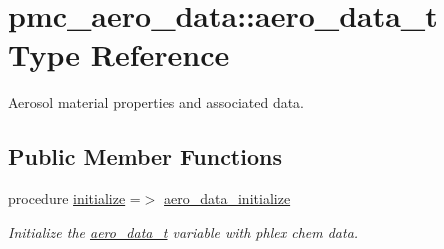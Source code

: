 \hypertarget{structpmc__aero__data_1_1aero__data__t}{}\section{pmc\+\_\+aero\+\_\+data\+:\+:aero\+\_\+data\+\_\+t Type Reference}
\label{structpmc__aero__data_1_1aero__data__t}


Aerosol material properties and associated data.  


\subsection*{Public Member Functions}
\begin{DoxyCompactItemize}
\item 
procedure \mbox{\hyperlink{structpmc__aero__data_1_1aero__data__t_a7c85cc32aa34208d32d039be9e7c803d}{initialize}} =$>$ \mbox{\hyperlink{namespacepmc__aero__data_a8496aa9cb03cd761a535fe6afb381059}{aero\+\_\+data\+\_\+initialize}}
\begin{DoxyCompactList}\small\item\em Initialize the \mbox{\hyperlink{structpmc__aero__data_1_1aero__data__t}{aero\+\_\+data\+\_\+t}} variable with phlex chem data. \end{DoxyCompactList}\end{DoxyCompactItemize}
